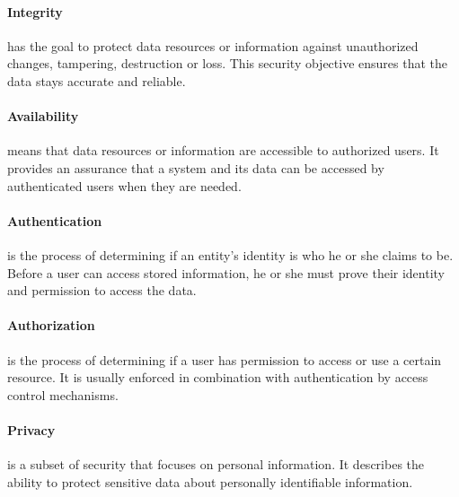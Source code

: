 \paragraph{Integrity} has the goal to protect data resources or information against unauthorized changes, tampering, destruction or loss. This security objective ensures that the data stays accurate and reliable.

\paragraph{Availability} means that data resources or information are accessible to authorized users. It provides an assurance that a system and its data can be accessed by authenticated users when they are needed.

\paragraph{Authentication} is the process of determining if an entity's identity is who he or she claims to be. Before a user can access stored information, he or she must prove their identity and permission to access the data.

\paragraph{Authorization} is the process of determining if a user has permission to access or use a certain resource. It is usually enforced in combination with authentication by access control mechanisms.

\paragraph{Privacy} is a subset of security that focuses on personal information. It describes the ability to protect sensitive data about personally identifiable information. 
